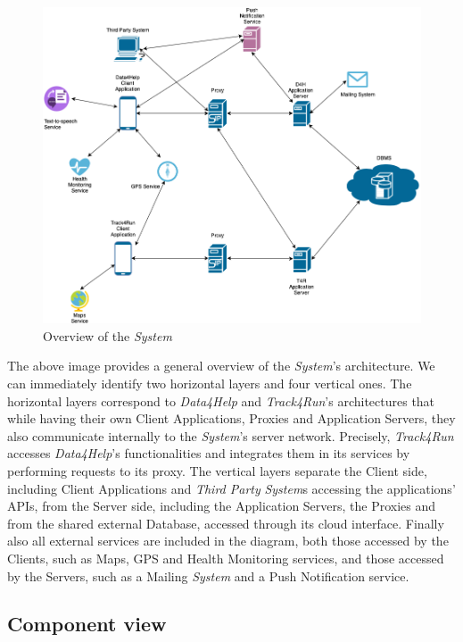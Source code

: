 \documentclass[titlepage]{article}
\begin{document}
\begin{figure}[H]
	\center
  	\includegraphics[width=\textwidth]{Overview.png}
  	\caption{Overview of the {\it System}}
 	\label{fig:OVERVIEW}
\end{figure}
\noindent
The above image provides a general overview of the {\it System}’s architecture. We can immediately identify two horizontal layers and four vertical ones.
The horizontal layers correspond to {\it Data4Help} and {\it Track4Run}’s architectures that while having their own Client Applications, Proxies and Application Servers, they also communicate internally to the {\it System}’s server network. 
Precisely, {\it Track4Run} accesses {\it Data4Help}’s functionalities and integrates them in its services by performing requests to its proxy.
The vertical layers separate the Client side, including Client Applications and {\it Third Party} {\it System}s accessing the applications’ APIs, from the Server side, including the Application Servers, the Proxies and from the shared external Database, accessed through its cloud interface.
Finally also all external services are included in the diagram, both those accessed by the Clients, such as Maps, GPS and Health Monitoring services, and those accessed by the Servers, such as a Mailing {\it System} and a Push Notification service.
\pagebreak

\subsection{Component view}
\end{document}
